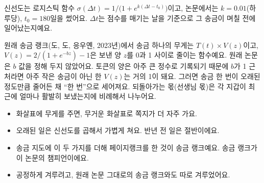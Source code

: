 \begin{deeper}
신선도는 로지스틱 함수 $\sigma(\Delta t) = 1/\bigl(1+e^{k(\Delta t - t_0)}\bigr)$이고,
논문에서는 $k=0.01$(하루당), $t_0=180$일을 썼어요.
$\Delta t$는 점수를 매기는 날을 기준으로 그 송금이 며칠 전에 일어났는지예요.

원래 송금 랭크(도, 도, 응우옌, 2023년)에서 송금 하나의 무게는 $T(t)\times V(z)$이고,
$V(z) = 2/(1+e^{-bz}) - 1$은 보낸 양 $z$를 0과 1 사이로 줄이는 함수예요.
원래 논문은 $b$ 값을 정해 두지 않았어요.
토큰의 양은 아주 큰 정수로 기록되기 때문에 $b$가 1 근처라면 아주 작은 송금이 아닌 한 $V(z)$는 거의 1이 돼요.
그러면 송금 한 번이 오래된 정도만큼 줄어든 채 “한 번”으로 세어져요.
되돌아가는 몫(선생님 몫)은 각 지갑이 최근에 얼마나 활발히 보냈는지에 비례해서 나누어요.
\end{deeper}

\begin{learned}
\begin{itemize}
\item 화살표에 무게를 주면, 무거운 화살표로 쪽지가 더 자주 가요.
\item 오래된 일은 신선도를 곱해서 가볍게 쳐요. 반년 전 일은 절반이에요.
\item 송금 지도에 이 두 가지를 더해 페이지랭크를 한 것이 송금 랭크예요. 송금 랭크가 이 논문의 챔피언이에요.
\item 공정하게 겨루려고, 원래 논문 그대로의 송금 랭크와도 따로 겨루었어요.
\end{itemize}
\end{learned}

